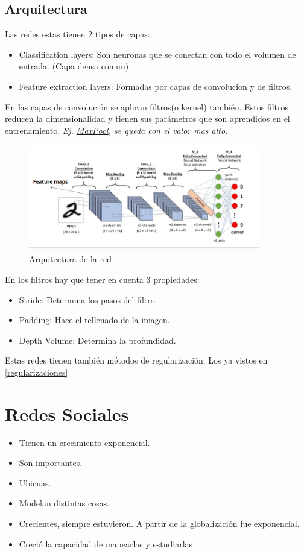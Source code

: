 \documentclass[titlepage,a4paper]{article}
\begin{document}
\subsection*{Arquitectura}
Las redes estas tienen 2 tipos de capas:
\begin{itemize}
    \item Classification layers: Son neuronas que se conectan con todo el volumen de entrada. (Capa densa comun)
    \item Feature extraction layers: Formadas por capas de convolucion y de filtros.
\end{itemize}

En las capas de convolución se aplican filtros(o kernel) también. Estos filtros reducen la dimensionalidad y tienen sus parámetros que son aprendidos en el entrenamiento. \textit{Ej. \href{https://developers.google.com/machine-learning/practica/image-classification/images/maxpool_animation.gif?hl=es}{MaxPool}, se queda con el valor mas alto}.

\begin{figure}[!htb]
    \centering
    \includegraphics[width=0.9\textwidth]{imagenesResumen/ArquitecturaRedConvolucional.PNG}
    \caption{Arquitectura de la red}
\end{figure}

En los filtros hay que tener en cuenta 3 propiedades:
\begin{itemize}
    \item Stride: Determina los pasos del filtro.
    \item Padding: Hace el rellenado de la imagen.
    \item Depth Volume: Determina la profundidad.
\end{itemize}

Estas redes tienen también métodos de regularización. Los ya vistos en \ref{regularizaciones}

\section{Redes Sociales}
\begin{itemize}
    \item Tienen un crecimiento exponencial.
    \item Son importantes.
    \item Ubicuas.
    \item Modelan distintas cosas.
    \item Crecientes, siempre estuvieron. A partir de la globalización fue exponencial.
    \item Creció la capacidad de mapearlas y estudiarlas.
\end{itemize}
\end{document}
